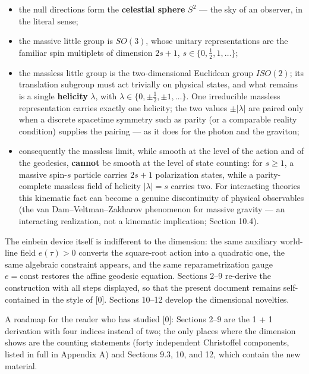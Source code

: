 \documentclass[
]{article}
\providecommand{\tightlist}{%
  \setlength{\itemsep}{0pt}\setlength{\parskip}{0pt}}
\begin{document}
\begin{itemize}
\tightlist
\item
  the null directions form the \textbf{celestial sphere} \(S^{2}\) ---
  the sky of an observer, in the literal sense;
\item
  the massive little group is \(SO(3)\), whose unitary representations
  are the familiar spin multiplets of dimension \(2s + 1\),
  \(s \in \{0, \tfrac{1}{2}, 1, \ldots\}\);
\item
  the massless little group is the two-dimensional Euclidean group
  \(ISO(2)\); its translation subgroup must act trivially on physical
  states, and what remains is a single \textbf{helicity} \(\lambda\),
  with \(\lambda \in \{0, \pm\tfrac{1}{2}, \pm1, \ldots\}\). One
  irreducible massless representation carries exactly one helicity; the
  two values \(\pm|\lambda|\) are paired only when a discrete spacetime
  symmetry such as parity (or a comparable reality condition) supplies
  the pairing --- as it does for the photon and the graviton;
\item
  consequently the massless limit, while smooth at the level of the
  action and of the geodesics, \textbf{cannot} be smooth at the level of
  state counting: for \(s \geq 1\), a massive spin-\(s\) particle
  carries \(2s+1\) polarization states, while a parity-complete massless
  field of helicity \(|\lambda| = s\) carries two. For interacting
  theories this kinematic fact can become a genuine discontinuity of
  physical observables (the van Dam--Veltman--Zakharov phenomenon for
  massive gravity --- an interacting realization, not a kinematic
  implication; Section 10.4).
\end{itemize}

The einbein device itself is indifferent to the dimension: the same
auxiliary world-line field \(e(\tau) > 0\) converts the square-root
action into a quadratic one, the same algebraic constraint appears, and
the same reparametrization gauge \(e = \mathrm{const}\) restores the
affine geodesic equation. Sections 2--9 re-derive the construction with
all steps displayed, so that the present document remains self-contained
in the style of {[}0{]}. Sections 10--12 develop the dimensional
novelties.

A roadmap for the reader who has studied {[}0{]}: Sections 2--9 are the
1 + 1 derivation with four indices instead of two; the only places where
the dimension shows are the counting statements (forty independent
Christoffel components, listed in full in Appendix A) and Sections 9.3,
10, and 12, which contain the new material.
\end{document}

